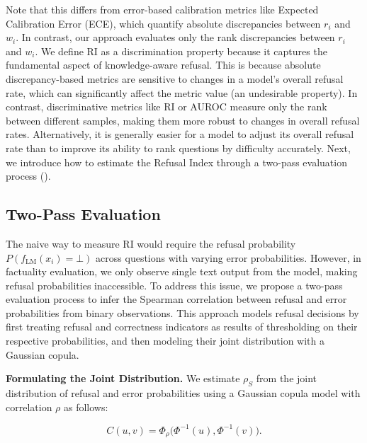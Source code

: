 Note that this differs from error-based calibration metrics like Expected Calibration Error (ECE), which quantify absolute discrepancies between $r_i$ and $w_i$. 
In contrast, our approach evaluates only the rank discrepancies between $r_i$ and $w_i$.
We define RI as a discrimination property because it captures the fundamental aspect of knowledge-aware refusal. 
This is because absolute discrepancy-based metrics are sensitive to changes in a model's overall refusal rate, which can significantly affect the metric value (an undesirable property). 
In contrast, discriminative metrics like RI or AUROC measure only the rank between different samples, making them more robust to changes in overall refusal rates. 
Alternatively, it is generally easier for a model to adjust its overall refusal rate than to improve its ability to rank questions by difficulty accurately.
Next, we introduce how to estimate the Refusal Index through a two-pass evaluation process ().


\vspace{-0.5em}
\subsection{Two-Pass Evaluation}
\vspace{-0.5em}
\label{sec:two_pass_evaluation}

The naive way to measure RI would require the refusal probability $P(f_{\text{LM}}(x_i) = \bot)$ across questions with varying error probabilities. 
However, in factuality evaluation, we only observe single text output from the model, making refusal probabilities inaccessible. 
To address this issue, we propose a two-pass evaluation process to infer the Spearman correlation between refusal and error probabilities from binary observations. 
This approach models refusal decisions by first treating refusal and correctness indicators as results of thresholding on their respective probabilities, and then modeling their joint distribution with a Gaussian copula. 


\noindent\textbf{Formulating the Joint Distribution.} We estimate $\rho_S$ from the joint distribution of refusal and error probabilities using a Gaussian copula model with correlation $\rho$ as follows:

\vspace{-1em}
\begin{equation}
C(u,v) = \Phi_\rho\!\big(\Phi^{-1}(u), \Phi^{-1}(v)\big).
\end{equation}
\vspace{-1.5em}

